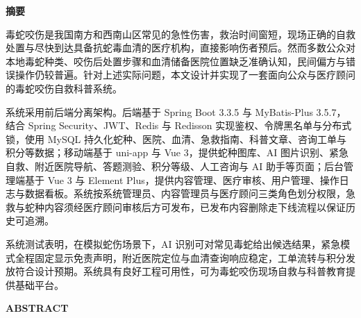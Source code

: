 \documentclass[12pt, a4paper, oneside]{ctexrep}
\begin{document}


\clearpage
{}
\thispagestyle{plain}
{}
\vspace*{24pt}
\begin{center}
  {\heiti\bfseries\fontsize{16pt}{16pt}\selectfont 摘\quad 要}
\end{center}
\vspace{18pt}

{\songti{}\fontsize{12pt}{20pt}\selectfont\parindent=0pt\parskip=0pt
\noindent\hspace*{2em}毒蛇咬伤是我国南方和西南山区常见的急性伤害，救治时间窗短，现场正确的自救处置与尽快到达具备抗蛇毒血清的医疗机构，直接影响伤者预后。然而多数公众对本地毒蛇种类、咬伤后处置步骤和血清储备医院位置缺乏准确认知，民间偏方与错误操作仍较普遍。针对上述实际问题，本文设计并实现了一套面向公众与医疗顾问的毒蛇咬伤自救科普系统。\par
\noindent\hspace*{2em}系统采用前后端分离架构。后端基于 Spring Boot 3.3.5 与 MyBatis-Plus 3.5.7，结合 Spring Security、JWT、Redis 与 Redisson 实现鉴权、令牌黑名单与分布式锁，使用 MySQL 持久化蛇种、医院、血清、急救指南、科普文章、咨询工单与积分等数据；移动端基于 uni-app 与 Vue 3，提供蛇种图库、AI 图片识别、紧急自救、附近医院导航、答题测验、积分等级、人工咨询与 AI 助手等页面；后台管理端基于 Vue 3 与 Element Plus，提供内容管理、医疗审核、用户管理、操作日志与数据看板。系统按系统管理员、内容管理员与医疗顾问三类角色划分权限，急救与蛇种内容须经医疗顾问审核后方可发布，已发布内容删除走下线流程以保证历史可追溯。
}
\par
{\songti{}\fontsize{12pt}{20pt}\selectfont\parindent=0pt\parskip=0pt
\noindent\hspace*{2em}系统测试表明，在模拟蛇伤场景下，AI 识别可对常见毒蛇给出候选结果，紧急模式全程固定显示免责声明，附近医院定位与血清查询响应稳定，工单流转与积分发放符合设计预期。系统具有良好工程可用性，可为毒蛇咬伤现场自救与科普教育提供基础平台。
}

\vspace{1em}

\clearpage
{}
\thispagestyle{plain}
{}
\vspace*{24pt}
\begin{center}
  {\rmfamily\bfseries\fontsize{16pt}{16pt}\selectfont ABSTRACT}
\end{center}
\vspace{18pt}
\end{document}
